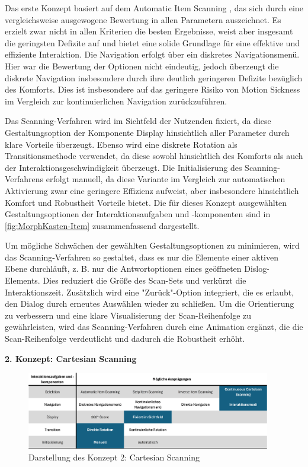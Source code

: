 Das erste Konzept basiert auf dem Automatic Item Scanning , das sich durch eine vergleichsweise ausgewogene Bewertung in allen Parametern auszeichnet. Es erzielt zwar nicht in allen Kriterien die besten Ergebnisse, weist aber insgesamt die geringsten Defizite auf und bietet eine solide Grundlage für eine effektive und effiziente Interaktion. Die Navigation erfolgt über ein diskretes Navigationsmenü. Hier war die Bewertung der Optionen nicht eindeutig, jedoch überzeugt die diskrete Navigation insbesondere durch ihre deutlich geringeren Defizite bezüglich des Komforts. Dies ist insbesondere auf das geringere Risiko von Motion Sickness im Vergleich zur kontinuierlichen Navigation zurückzuführen.

Das Scanning-Verfahren wird im Sichtfeld der Nutzenden fixiert, da diese Gestaltungsoption der Komponente Display hinsichtlich aller Parameter durch klare Vorteile überzeugt. Ebenso wird eine diskrete Rotation als Transitionsmethode verwendet, da diese sowohl hinsichtlich des Komforts als auch der Interaktionsgeschwindigkeit überzeugt. Die Initialisierung des Scanning-Verfahrens erfolgt manuell, da diese Variante im Vergleich zur automatischen Aktivierung zwar eine geringere Effizienz aufweist, aber insbesondere hinsichtlich Komfort und Robustheit Vorteile bietet.
Die für dieses Konzept ausgewählten Gestaltungsoptionen der Interaktionsaufgaben und -komponenten sind in \autoref{fig:MorphKasten-Item} zusammenfassend dargestellt.

Um mögliche Schwächen der gewählten Gestaltungsoptionen zu minimieren, wird das Scanning-Verfahren so gestaltet, dass es nur die Elemente einer aktiven Ebene durchläuft, z. B. nur die Antwortoptionen eines geöffneten Dislog-Elements. Dies reduziert die Größe des Scan-Sets und verkürzt die Interaktionszeit. Zusätzlich wird eine "Zurück"-Option integriert, die es erlaubt, den Dialog durch erneutes Auswählen wieder zu schließen. Um die Orientierung zu verbessern und eine klare Visualisierung der Scan-Reihenfolge zu gewährleisten, wird das Scanning-Verfahren durch eine Animation ergänzt, die die Scan-Reihenfolge verdeutlicht und dadurch die Robustheit erhöht.

{\normalfont \bfseries 2. Konzept: Cartesian Scanning}

\begin{figure}[tbh]
    \centering
    \includegraphics[width=0.95\textwidth]{images/MorphKasten-Cartesian.png}
    \caption{Darstellung des Konzept 2: Cartesian Scanning}
    \label{fig:MorphKasten-Cartesian}
\end{figure}

